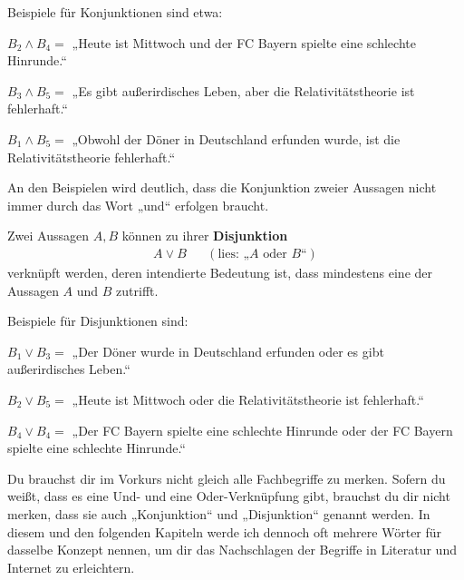 \begin{bsp}
    Beispiele für Konjunktionen sind etwa:
    \begin{labeling}[resume*=propbsp]
        \item[$B_2\land B_4=$] „Heute ist Mittwoch und der FC Bayern spielte eine schlechte Hinrunde.“
        \item[$B_3\land B_5=$] „Es gibt außerirdisches Leben, aber die Relativitätstheorie ist fehlerhaft.“
        \item[$B_1\land B_5=$] „Obwohl der Döner in Deutschland erfunden wurde, ist die Relativitätstheorie fehlerhaft.“
    \end{labeling}
    An den Beispielen wird deutlich, dass die Konjunktion zweier Aussagen nicht immer durch das Wort „und“ erfolgen braucht.
\end{bsp}
	
	
\begin{defin} 
    Zwei Aussagen $A,B$ können zu ihrer \textbf{Disjunktion}
    \begin{align*}
        A\lor B && (\text{lies: „$A$ oder $B$“})
    \end{align*}
    verknüpft werden, deren intendierte Bedeutung ist, dass mindestens eine der Aussagen $A$ und $B$ zutrifft.
\end{defin}
    

\begin{bsp}
    Beispiele für Disjunktionen sind:
    \begin{labeling}[resume*=propbsp]
        \item[$B_1\lor B_3=$] „Der Döner wurde in Deutschland erfunden oder es gibt außerirdisches Leben.“
        \item[$B_2\lor B_5=$] „Heute ist Mittwoch oder die Relativitätstheorie ist fehlerhaft.“
        \item[$B_4\lor B_4=$] „Der FC Bayern spielte eine schlechte Hinrunde oder der FC Bayern spielte eine schlechte Hinrunde.“
    \end{labeling}
\end{bsp}

		
\begin{bem}[Fachbegriffe]
    Du brauchst dir im Vorkurs nicht gleich alle Fachbegriffe zu merken. Sofern du weißt, dass es eine Und- und eine Oder-Verknüpfung gibt, brauchst du dir nicht merken, dass sie auch „Konjunktion“ und „Disjunktion“ genannt werden. In diesem und den folgenden Kapiteln werde ich dennoch oft mehrere Wörter für dasselbe Konzept nennen, um dir das Nachschlagen der Begriffe in Literatur und Internet zu erleichtern.
\end{bem}

